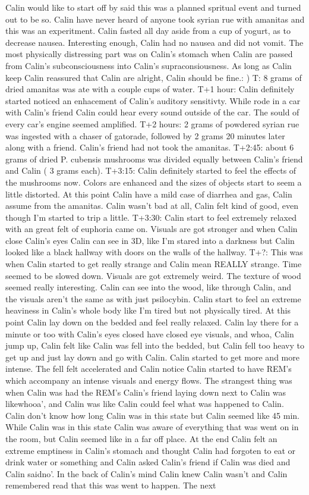 \documentclass[12pt]{book}
\begin{document}
Calin would like to start off by said this was a planned spritual event and turned out to be so. Calin have never heard of anyone took syrian rue with amanitas and this was an experitment. Calin fasted all day aside from a cup of yogurt, as to decrease nausea. Interesting enough, Calin had no nausea and did not vomit. The most physically distressing part was on Calin's stomach when Calin are passed from Calin's subconsciousness into Calin's supraconsiousness. As long as Calin keep Calin reassured that Calin are alright, Calin should be fine.: ) T: 8 grams of dried amanitas was ate with a couple cups of water. T+1 hour: Calin definitely started noticed an enhacement of Calin's auditory sensitivty. While rode in a car with Calin's friend Calin could hear every sound outside of the car. The sould of every car's engine seemed amplified. T+2 hours: 2 grams of powdered syrian rue was ingested with a chaser of gatorade, followed by 2 grams 20 minutes later along with a friend. Calin's friend had not took the amanitas. T+2:45: about 6 grams of dried P. cubensis mushrooms was divided equally between Calin's friend and Calin ( 3 grams each). T+3:15: Calin definitely started to feel the effects of the mushrooms now. Colors are enhanced and the sizes of objects start to seem a little distorted. At this point Calin have a mild case of diarrhea and gas, Calin assume from the amanitas. Calin wasn't bad at all, Calin felt kind of good, even though I'm started to trip a little. T+3:30: Calin start to feel extremely relaxed with an great felt of euphoria came on. Visuals are got stronger and when Calin close Calin's eyes Calin can see in 3D, like I'm stared into a darkness but Calin looked like a black hallway with doors on the walls of the hallway. T+?: This was when Calin started to get really strange and Calin mean REALLY strange. Time seemed to be slowed down. Visuals are got extremely weird. The texture of wood seemed really interesting. Calin can see into the wood, like through Calin, and the visuals aren't the same as with just psilocybin. Calin start to feel an extreme heaviness in Calin's whole body like I'm tired but not physically tired. At this point Calin lay down on the bedded and feel really relaxed. Calin lay there for a minute or too with Calin's eyes closed have closed eye visuals, and whoa, Calin jump up, Calin felt like Calin was fell into the bedded, but Calin fell too heavy to get up and just lay down and go with Calin. Calin started to get more and more intense. The fell felt accelerated and Calin notice Calin started to have REM's which accompany an intense visuals and energy flows. The strangest thing was when Calin was had the REM's Calin's friend laying down next to Calin was likewhooa', and Calin was like Calin could feel what was happened to Calin. Calin don't know how long Calin was in this state but Calin seemed like 45 min. While Calin was in this state Calin was aware of everything that was went on in the room, but Calin seemed like in a far off place. At the end Calin felt an extreme emptiness in Calin's stomach and thought Calin had forgoten to eat or drink water or something and Calin asked Calin's friend if Calin was died and Calin saidno'. In the back of Calin's mind Calin knew Calin wasn't and Calin remembered read that this was went to happen. The next 
\end{document}
